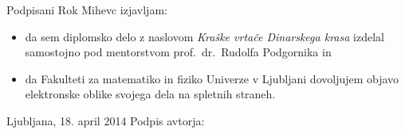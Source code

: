 \documentclass[a4paper, twoside, 12pt]{book}
\begin{document}
      \vspace{1cm} \noindent Podpisani Rok Mihevc izjavljam:
      \noindent 

      \begin{itemize}
        \item 
          da sem diplomsko delo z naslovom \emph{Kraške vrtače Dinarskega krasa} izdelal samostojno pod mentorstvom prof.\ dr.\ \mbox{Rudolfa} \mbox{Podgornika} in
        \item
          da Fakulteti za matematiko in fiziko Univerze v Ljubljani dovoljujem objavo elektronske 
          oblike svojega dela na spletnih straneh.
      \end{itemize}

      \vspace{1cm} \noindent Ljubljana, 18. april 2014 \hfill Podpis avtorja:


      
\end{document}
